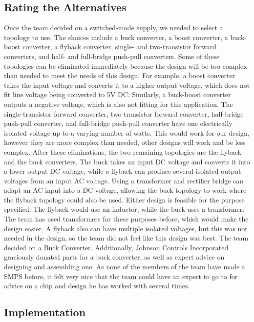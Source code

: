 \subsection{Rating the Alternatives}
Once the team decided on a switched-mode supply, we needed to select a topology to use. The choices include a buck converter, a boost converter, a buck-boost converter, a flyback converter, single- and two-transistor forward converters, and half- and full-bridge push-pull converters. Some of these topologies can be eliminated immediately because the design will be too complex than needed to meet the needs of this design. For example, a boost converter takes the input voltage and converts it to a higher output voltage, which does not fit line voltage being converted to 5V DC. Similarly, a buck-boost converter outputs a negative voltage, which is also not fitting for this application. The single-transistor forward converter, two-transistor forward converter, half-bridge push-pull converter, and full-bridge push-pull converter have one electrically isolated voltage up to a varying number of watts. This would work for our design, however they are more complex than needed, other designs will work and be less complex. After these eliminations, the two remaining topologies are the flyback and the buck converters. The buck takes an input DC voltage and converts it into a lower output DC voltage, while a flyback can produce several isolated output voltages from an input AC voltage. Using a transformer and rectifier bridge can adapt an AC input into a DC voltage, allowing the buck topology to work where the flyback topology could also be used. Either design is feasible for the purpose specified. The flyback would use an inductor, while the buck uses a transformer. The team has used transformers for these purposes before, which would make the design easier. A flyback also can have multiple isolated voltages, but this was not needed in the design, so the team did not feel like this design was best. The team decided on a Buck Converter. Additionally,  Johnson Controls Incorporated graciously donated parts for a buck converter, as well as expert advice on designing and assembling one. As none of the members of the team have made a SMPS before, it felt very nice that the team could have an expert to go to for advice on a chip and design he has worked with several times.

\subsection{Implementation}
